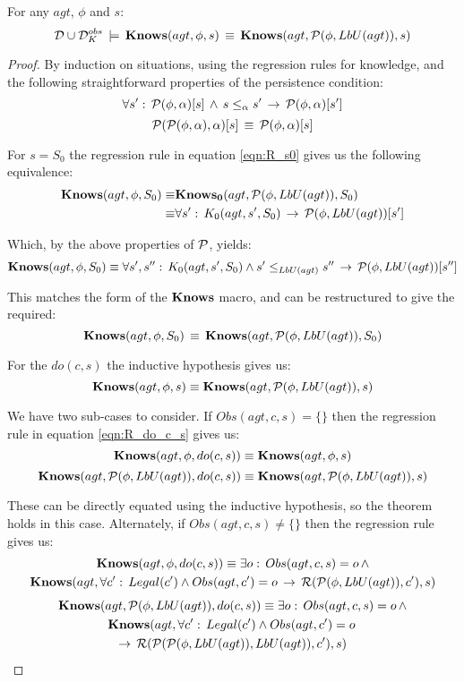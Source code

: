 \begin{lemmaext}
[\ref{lem:Knows_impl_KnowsLbU}] For any $agt$, $\phi$ and
$s$:\[
\mathcal{D}\cup\mathcal{D}_{K}^{obs}\,\models\,\mathbf{Knows}(agt,\phi,s)\,\equiv\,\mathbf{Knows}(agt,\mathcal{P}(\phi,LbU(agt)),s)\]

\end{lemmaext}
\begin{proof}
By induction on situations, using the regression rules for knowledge,
and the following straightforward properties of the persistence condition:\[
\forall s':\,\mathcal{P}(\phi,\alpha)[s]\,\wedge\, s\leq_{\alpha}s'\,\rightarrow\,\mathcal{P}(\phi,\alpha)[s']\]
\[
\mathcal{P}(\mathcal{P}(\phi,\alpha),\alpha)[s]\,\equiv\,\mathcal{P}(\phi,\alpha)[s]\]


For $s=S_{0}$ the regression rule in equation \eqref{eqn:R_s0} gives
us the following equivalence:\begin{align*}
\mathbf{Knows}(agt,\phi,S_{0})\equiv & \mathbf{Knows_{0}}(agt,\mathcal{P}(\phi,LbU(agt)),S_{0})\\
\equiv & \forall s':\, K_{0}(agt,s',S_{0})\,\rightarrow\,\mathcal{P}(\phi,LbU(agt))[s']\end{align*}


Which, by the above properties of $\mathcal{P}$, yields:\[
\mathbf{Knows}(agt,\phi,S_{0})\equiv\forall s',s'':\, K_{0}(agt,s',S_{0})\wedge s'\leq_{LbU(agt)}s''\,\rightarrow\,\mathcal{P}(\phi,LbU(agt))[s'']\]


This matches the form of the $\mathbf{Knows}$ macro, and can be restructured
to give the required:\[
\mathbf{Knows}(agt,\phi,S_{0})\,\equiv\,\mathbf{Knows}(agt,\mathcal{P}(\phi,LbU(agt)),S_{0})\]


For the $do(c,s)$ the inductive hypothesis gives us:\[
\mathbf{Knows}(agt,\phi,s)\equiv\mathbf{Knows}(agt,\mathcal{P}(\phi,LbU(agt)),s)\]


We have two sub-cases to consider. If $Obs(agt,c,s)=\{\}$ then the
regression rule in equation \eqref{eqn:R_do_c_s} gives us:\[
\mathbf{Knows}(agt,\phi,do(c,s))\equiv\mathbf{Knows}(agt,\phi,s)\]
 \[
\mathbf{Knows}(agt,\mathcal{P}(\phi,LbU(agt)),do(c,s))\equiv\mathbf{Knows}(agt,\mathcal{P}(\phi,LbU(agt)),s)\]


These can be directly equated using the inductive hypothesis, so the
theorem holds in this case. Alternately, if $Obs(agt,c,s)\neq\{\}$
then the regression rule gives us:\begin{multline*}
\mathbf{Knows}(agt,\phi,do(c,s))\equiv\exists o:\, Obs(agt,c,s)=o\,\wedge\\
\mathbf{Knows}(agt,\forall c':\, Legal(c')\wedge Obs(agt,c')=o\,\rightarrow\,\mathcal{R}(\mathcal{P}(\phi,LbU(agt)),c'),s)\end{multline*}
 \begin{multline*}
\mathbf{Knows}(agt,\mathcal{P}(\phi,LbU(agt)),do(c,s))\equiv\exists o:\, Obs(agt,c,s)=o\,\wedge\\
\mathbf{Knows}(agt,\forall c':\, Legal(c')\wedge Obs(agt,c')=o\,\\
\rightarrow\,\mathcal{R}(\mathcal{P}(\mathcal{P}(\phi,LbU(agt)),LbU(agt)),c'),s)\end{multline*}



\end{proof}
